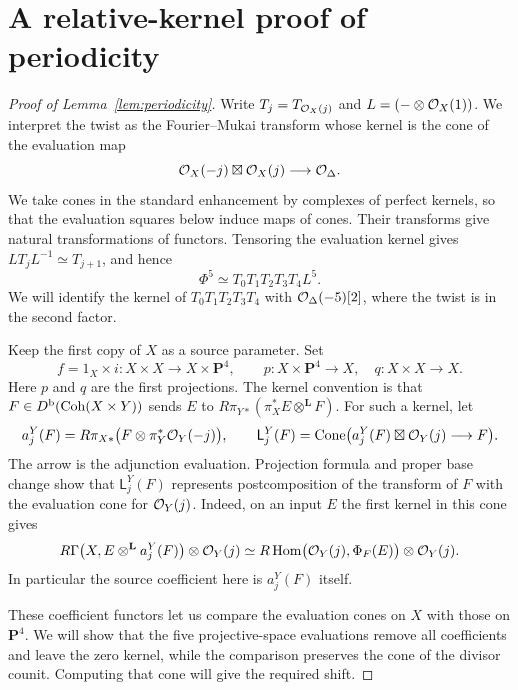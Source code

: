 \section{A relative-kernel proof of periodicity}
\label{app:periodicity}

\begin{proof}[Proof of Lemma~\ref{lem:periodicity}]
Write $T_j=T_{\mathcal O_X(j)}$ and $L=(-\otimes\mathcal O_X(1))$.
We interpret the twist as the Fourier--Mukai transform whose kernel is
the cone of the evaluation map
\[
 \mathcal O_X(-j)\boxtimes\mathcal O_X(j)\longrightarrow\mathcal O_\Delta.
\]
We take cones in the standard enhancement by complexes of perfect
kernels, so that the evaluation squares below induce maps of cones.
Their transforms give natural transformations of functors. Tensoring the evaluation
kernel gives $LT_jL^{-1}\simeq T_{j+1}$, and hence
\begin{equation}\label{eq:twist-product}
 \Phi^5\simeq T_0T_1T_2T_3T_4L^5.
\end{equation}
We will identify the kernel of $T_0T_1T_2T_3T_4$ with
$\mathcal O_\Delta(-5)[2]$, where the twist is in the second factor.

Keep the first copy of $X$ as a source parameter. Set
\[
 f=1_X\times i\colon X\times X\longrightarrow X\times\mathbf P^4,
 \qquad
 p\colon X\times\mathbf P^4\longrightarrow X,
 \quad q\colon X\times X\longrightarrow X.
\]
Here $p$ and $q$ are the first projections.
The kernel convention is that $F\in D^{\mathrm b}(\operatorname{Coh}(X\times Y))$ sends $E$ to
$R\pi_{Y*}(\pi_X^*E\otimes^{\mathbf L}F)$.
For such a kernel, let
\[
 a_j^Y(F)=R\pi_{X*}\bigl(F\otimes\pi_Y^*\mathcal O_Y(-j)\bigr),
 \qquad
 \mathsf L_j^Y(F)=
 \operatorname{Cone}\bigl(a_j^Y(F)\boxtimes\mathcal O_Y(j)\longrightarrow F\bigr).
\]
The arrow is the adjunction evaluation. Projection formula and proper
base change show that $\mathsf L_j^Y(F)$ represents postcomposition of
the transform of $F$ with the evaluation cone for $\mathcal O_Y(j)$.
Indeed, on an input $E$ the first kernel in this cone gives
\[
 R\Gamma\bigl(X,E\otimes^{\mathbf L}a_j^Y(F)\bigr)\otimes\mathcal O_Y(j)
 \simeq
 R\operatorname{Hom}\bigl(\mathcal O_Y(j),\Phi_F(E)\bigr)\otimes\mathcal O_Y(j).
\]
In particular the source coefficient here is $a_j^Y(F)$ itself.

These coefficient functors let us compare the evaluation cones on $X$ with
those on $\mathbf P^4$. We will show that the five projective-space
evaluations remove all coefficients and leave the zero kernel, while the
comparison preserves the cone of the divisor counit. Computing that cone
will give the required shift.


\end{proof}
